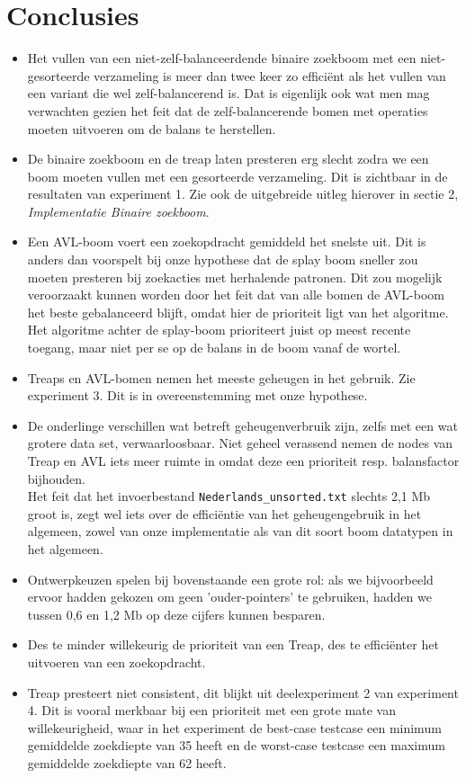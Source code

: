 \documentclass[a4paper,10pt]{article}
\begin{document}
\section{Conclusies}
\begin{itemize}
\item Het vullen van een niet-zelf-balanceerdende binaire zoekboom met een niet-gesorteerde verzameling is meer dan twee keer zo effici\"ent als het vullen van een variant die wel zelf-balancerend is. Dat is eigenlijk ook wat men mag verwachten gezien het feit dat de zelf-balancerende bomen met operaties moeten uitvoeren om de balans te herstellen.
\item De binaire zoekboom en de treap laten presteren erg slecht zodra we een boom moeten vullen met een gesorteerde verzameling. Dit is zichtbaar in de resultaten van experiment 1. Zie ook de uitgebreide uitleg hierover in sectie 2, \emph{Implementatie Binaire zoekboom}.
\item Een AVL-boom voert een zoekopdracht gemiddeld het snelste uit. Dit is anders dan voorspelt bij onze hypothese dat de splay boom sneller zou moeten presteren bij zoekacties met herhalende patronen. Dit zou mogelijk veroorzaakt kunnen worden door het feit dat van alle bomen de AVL-boom het beste gebalanceerd blijft, omdat hier de prioriteit ligt van het algoritme. Het algoritme achter de splay-boom prioriteert juist op meest recente toegang, maar niet per se op de balans in de boom vanaf de wortel. 
\item Treaps en AVL-bomen nemen het meeste geheugen in het gebruik. Zie experiment 3. Dit is in overeenstemming met onze hypothese.
\item De onderlinge verschillen wat betreft geheugenverbruik zijn, zelfs met een wat grotere data set, verwaarloosbaar. Niet geheel verassend nemen de nodes van Treap en AVL iets meer ruimte in omdat deze een prioriteit resp. balansfactor bijhouden.\\
Het feit dat het invoerbestand \texttt{Nederlands\_unsorted.txt} slechts 2,1 Mb groot is, zegt wel iets over de effici\"entie van het geheugengebruik in het algemeen, zowel van onze implementatie als van dit soort boom datatypen in het algemeen.
\item Ontwerpkeuzen spelen bij bovenstaande een grote rol: als we bijvoorbeeld ervoor hadden gekozen om geen 'ouder-pointers' te gebruiken, hadden we tussen 0,6 en 1,2 Mb op deze cijfers kunnen besparen. 
\item Des te minder willekeurig de prioriteit van een Treap, des te effici\"enter het uitvoeren van een zoekopdracht.
\item Treap presteert niet consistent, dit blijkt uit deelexperiment 2 van experiment 4. Dit is vooral merkbaar bij een prioriteit met een grote mate van willekeurigheid, waar in het experiment de best-case testcase een minimum gemiddelde zoekdiepte van 35 heeft en de worst-case testcase een maximum gemiddelde zoekdiepte van 62 heeft.
\end{itemize}
\end{document}
